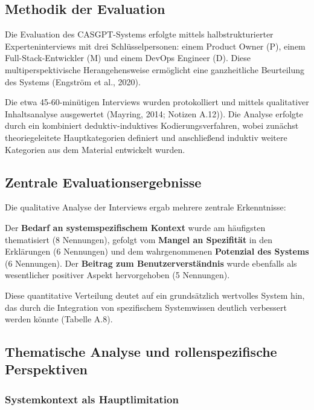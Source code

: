 \documentclass[
  a4paper,
  12pt,
  oneside,
  open=any,
  BCOR=12mm,
  DIV=14,
  parskip=half*,
  headsepline,
  footsepline,
  pointlessnumbers,
  liststotoc,
  numbers=noenddot,
  listof=totoc]{scrartcl}
\begin{document}
\subsection{Methodik der Evaluation}\label{methodik-der-evaluation}

Die Evaluation des CASGPT-Systems erfolgte mittels halbstrukturierter
Experteninterviews mit drei Schlüsselpersonen: einem Product Owner (P),
einem Full-Stack-Entwickler (M) und einem DevOps Engineer (D). Diese
multiperspektivische Herangehensweise ermöglicht eine ganzheitliche
Beurteilung des Systems (Engström et al., 2020).

Die etwa 45-60-minütigen Interviews wurden protokolliert und mittels
qualitativer Inhaltsanalyse ausgewertet (Mayring, 2014; Notizen A.12)).
Die Analyse erfolgte durch ein kombiniert deduktiv-induktives
Kodierungsverfahren, wobei zunächst theoriegeleitete Hauptkategorien
definiert und anschließend induktiv weitere Kategorien aus dem Material
entwickelt wurden.

\subsection{Zentrale
Evaluationsergebnisse}\label{zentrale-evaluationsergebnisse}

Die qualitative Analyse der Interviews ergab mehrere zentrale
Erkenntnisse:

Der \textbf{Bedarf an systemspezifischem Kontext} wurde am häufigsten
thematisiert (8 Nennungen), gefolgt vom \textbf{Mangel an Spezifität} in
den Erklärungen (6 Nennungen) und dem wahrgenommenen \textbf{Potenzial
des Systems} (6 Nennungen). Der \textbf{Beitrag zum Benutzerverständnis}
wurde ebenfalls als wesentlicher positiver Aspekt hervorgehoben (5
Nennungen).

Diese quantitative Verteilung deutet auf ein grundsätzlich wertvolles
System hin, das durch die Integration von spezifischem Systemwissen
deutlich verbessert werden könnte (Tabelle A.8).

\subsection{Thematische Analyse und rollenspezifische
Perspektiven}\label{thematische-analyse-und-rollenspezifische-perspektiven}

\subsubsection{Systemkontext als
Hauptlimitation}\label{systemkontext-als-hauptlimitation}
\end{document}
